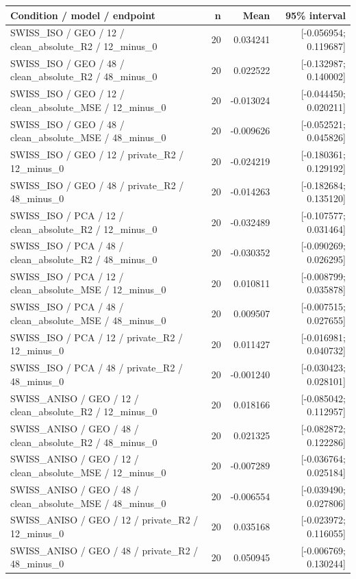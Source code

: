\begin{longtable}{p{.56\linewidth}rrr}
\toprule Condition / model / endpoint & n & Mean & 95\% interval\\\midrule
SWISS\_ISO / GEO / 12 / clean\_absolute\_R2 / 12\_minus\_0 & 20 & 0.034241 & [-0.056954; 0.119687] \\
SWISS\_ISO / GEO / 48 / clean\_absolute\_R2 / 48\_minus\_0 & 20 & 0.022522 & [-0.132987; 0.140002] \\
SWISS\_ISO / GEO / 12 / clean\_absolute\_MSE / 12\_minus\_0 & 20 & -0.013024 & [-0.044450; 0.020211] \\
SWISS\_ISO / GEO / 48 / clean\_absolute\_MSE / 48\_minus\_0 & 20 & -0.009626 & [-0.052521; 0.045826] \\
SWISS\_ISO / GEO / 12 / private\_R2 / 12\_minus\_0 & 20 & -0.024219 & [-0.180361; 0.129192] \\
SWISS\_ISO / GEO / 48 / private\_R2 / 48\_minus\_0 & 20 & -0.014263 & [-0.182684; 0.135120] \\
SWISS\_ISO / PCA / 12 / clean\_absolute\_R2 / 12\_minus\_0 & 20 & -0.032489 & [-0.107577; 0.031464] \\
SWISS\_ISO / PCA / 48 / clean\_absolute\_R2 / 48\_minus\_0 & 20 & -0.030352 & [-0.090269; 0.026295] \\
SWISS\_ISO / PCA / 12 / clean\_absolute\_MSE / 12\_minus\_0 & 20 & 0.010811 & [-0.008799; 0.035878] \\
SWISS\_ISO / PCA / 48 / clean\_absolute\_MSE / 48\_minus\_0 & 20 & 0.009507 & [-0.007515; 0.027655] \\
SWISS\_ISO / PCA / 12 / private\_R2 / 12\_minus\_0 & 20 & 0.011427 & [-0.016981; 0.040732] \\
SWISS\_ISO / PCA / 48 / private\_R2 / 48\_minus\_0 & 20 & -0.001240 & [-0.030423; 0.028101] \\
SWISS\_ANISO / GEO / 12 / clean\_absolute\_R2 / 12\_minus\_0 & 20 & 0.018166 & [-0.085042; 0.112957] \\
SWISS\_ANISO / GEO / 48 / clean\_absolute\_R2 / 48\_minus\_0 & 20 & 0.021325 & [-0.082872; 0.122286] \\
SWISS\_ANISO / GEO / 12 / clean\_absolute\_MSE / 12\_minus\_0 & 20 & -0.007289 & [-0.036764; 0.025184] \\
SWISS\_ANISO / GEO / 48 / clean\_absolute\_MSE / 48\_minus\_0 & 20 & -0.006554 & [-0.039490; 0.027806] \\
SWISS\_ANISO / GEO / 12 / private\_R2 / 12\_minus\_0 & 20 & 0.035168 & [-0.023972; 0.116055] \\
SWISS\_ANISO / GEO / 48 / private\_R2 / 48\_minus\_0 & 20 & 0.050945 & [-0.006769; 0.130244] \\

\end{longtable}
